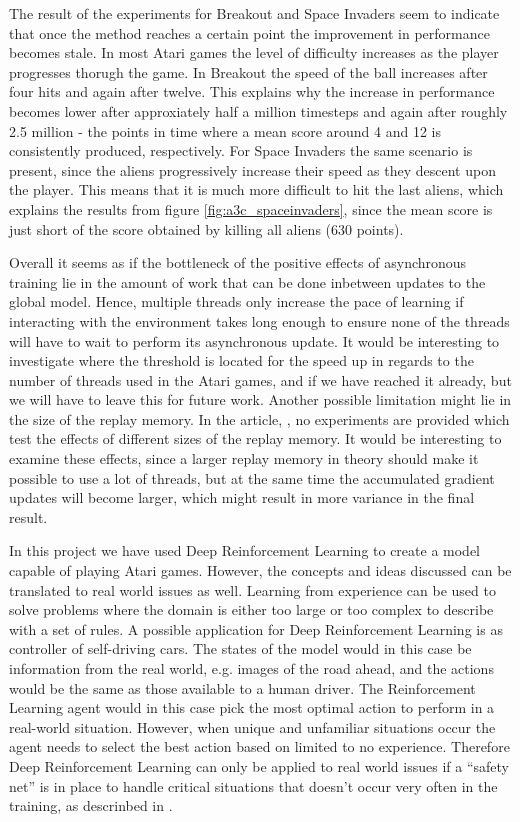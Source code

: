 \documentclass[11pt]{article}
\begin{document}
The result of the experiments for Breakout and Space Invaders
seem to indicate that once the method reaches a certain point
the improvement in performance becomes stale.
In most Atari games the level of difficulty increases as the
player progresses thorugh the game.
In Breakout the speed of the ball increases after
four hits and again after twelve.
This explains why the increase in performance becomes lower after
approxiately half a million timesteps and again after
roughly 2.5 million - the points in time where a mean score around 4 and 12
is consistently produced, respectively.
For Space Invaders the same scenario is present, since
the aliens progressively increase their speed as they
descent upon the player.
This means that it is much more difficult to hit the last aliens,
which explains the results from figure \ref{fig:a3c_spaceinvaders},
since the mean score is just short of the score obtained by killing all aliens (630 points).

Overall
it seems as if the bottleneck of the positive effects of asynchronous training
lie in the amount of work that can be done inbetween updates to the global model.
Hence, multiple threads only increase the pace of learning if
interacting with the environment takes long enough to ensure
none of the threads will have to wait to perform
its asynchronous update.
It would be interesting to investigate where the threshold is located
for the speed up in regards to the number of threads used in the Atari games,
and if we have reached it already, but we will have to leave this for future work.
Another possible limitation might lie in the size of the replay memory.
In the article, \cite{a3c}, no experiments are provided which test
the effects of different sizes of the replay memory.
It would be interesting to examine these effects, since a larger replay memory
in theory should make it possible to use a lot of threads, but at the same time
the accumulated gradient updates will become larger, which might result in
more variance in the final result.

In this project we have used Deep Reinforcement Learning to
create a model capable of playing Atari games.
However, the concepts and ideas discussed can be translated to real world
issues as well.
Learning from experience can be used to solve problems where the
domain is either too large or too complex to
describe with a set of rules.
A possible application for Deep Reinforcement Learning is
as controller of self-driving cars.
The states of the model would in this case be information
from the real world, e.g. images of the road ahead, 
and the actions would be the same as those available to
a human driver.
The Reinforcement Learning agent would in this case pick the most
optimal action to perform in a real-world situation.
However, when unique and unfamiliar situations occur 
the agent needs to select the best action based on limited to no
experience.
Therefore Deep Reinforcement Learning can only be applied
to real world issues if a “safety net” is in place
to handle critical situations that doesn't occur
very often in the training, as descrinbed in \cite{BILER}.
\end{document}
